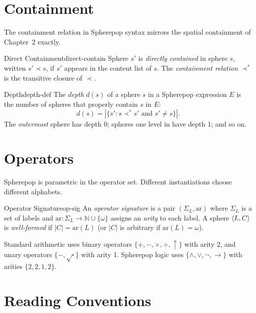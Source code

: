 \section{Containment}

The containment relation in Spherepop syntax mirrors the spatial containment
of Chapter~2 exactly.

\begin{definition}{Direct Containment}{direct-contain}
  Sphere $s'$ is \emph{directly contained} in sphere $s$, written
  $s' \prec s$, if $s'$ appears in the content list of $s$.
  The \emph{containment relation} $\prec^*$ is the transitive closure
  of $\prec$.
\end{definition}

\begin{definition}{Depth}{depth-def}
  The \emph{depth} $d(s)$ of a sphere $s$ in a Spherepop expression $E$
  is the number of spheres that properly contain $s$ in $E$:
  \[
    d(s) = |\{s' : s \prec^* s' \text{ and } s' \neq s\}|.
  \]
  The \emph{outermost} sphere has depth 0; spheres one level in have
  depth 1; and so on.
\end{definition}

\section{Operators}

Spherepop is parametric in the operator set. Different instantiations
choose different alphabets.

\begin{definition}{Operator Signature}{op-sig}
  An \emph{operator signature} is a pair $(\Sigma_L, \mathrm{ar})$
  where $\Sigma_L$ is a set of labels and
  $\mathrm{ar} : \Sigma_L \to \mathbb{N} \cup \{\omega\}$
  assigns an \emph{arity} to each label.
  A sphere $\langle L, C \rangle$ is \emph{well-formed} if $|C| = \mathrm{ar}(L)$
  (or $|C|$ is arbitrary if $\mathrm{ar}(L) = \omega$).
\end{definition}

Standard arithmetic uses binary operators $\{+, -, \times, \div, \uparrow\}$
with arity 2, and unary operators $\{-, \sqrt{\cdot}\}$ with arity 1.
Spherepop logic uses $\{\land, \lor, \neg, \to\}$ with arities $\{2,2,1,2\}$.

\section{Reading Conventions}

